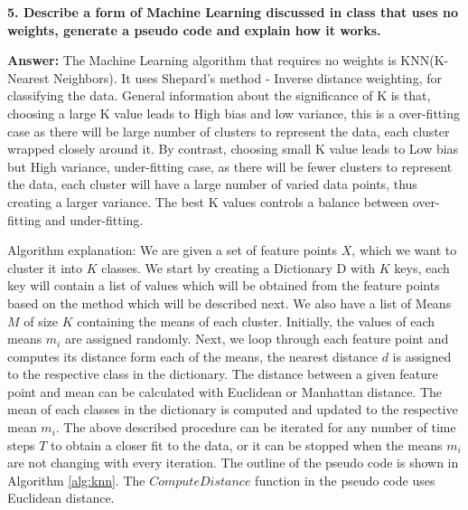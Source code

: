 \documentclass[a4paper, 10pt]{article}
\begin{document}
\hfill

\textbf{5. Describe a form of Machine Learning discussed in class that uses no weights, generate a pseudo code and explain how it works.}

\textbf{Answer:} The Machine Learning algorithm that requires no weights is KNN(K- Nearest Neighbors).  It uses Shepard’s method - Inverse distance weighting, for classifying the data. General information about the significance of K is that, choosing a large K value leads to High bias and low variance, this is a over-fitting case as there will be large number of clusters to represent the data, each cluster wrapped closely around it. By contrast, choosing small K value leads to Low bias but High variance, under-fitting case, as there will be fewer clusters to represent the data, each cluster will have a large number of varied data points, thus creating a larger variance. The best K values controls a balance between over-fitting and under-fitting.

Algorithm explanation:
We are given a set of feature points $X$, which we want to cluster it into $K$ classes. We start by creating a Dictionary D with $K$ keys, each key will contain a list of values which will be obtained from the feature points based on the method which will be described next. We also have a list of Means $M$ of size $K$ containing the means of each cluster. Initially, the values of each means $m_{i}$ are assigned randomly. Next, we loop through each feature point and computes its distance form each of the means, the nearest distance $d$ is assigned to the respective class in the dictionary. The distance between a given feature point and mean can be calculated with Euclidean or Manhattan distance. The mean of each classes in the dictionary is computed and updated to the respective mean $m_{i}$. The above described procedure can be iterated for any number of time steps $T$ to obtain a closer fit to the data, or it can be stopped when the means $m_{i}$ are not changing with every iteration. The outline of the pseudo code is shown in Algorithm \ref{alg:knn}. The $ComputeDistance$ function in the pseudo code uses Euclidean distance.
\end{document}
